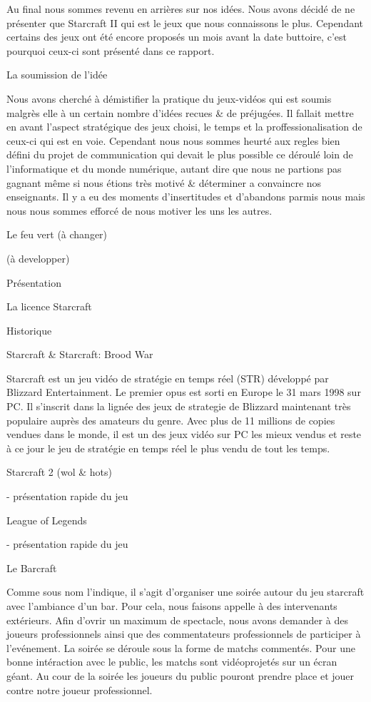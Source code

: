     Au final nous sommes revenu en arrières sur nos idées. Nous avons
    décidé de ne présenter que Starcraft II qui est le jeux que nous
    connaissons le plus. Cependant certains des jeux ont été encore
    proposés un mois avant la date buttoire, c'est pourquoi ceux-ci sont
    présenté dans ce rapport.

  La soumission de l'idée

    Nous avons cherché à démistifier la pratique du jeux-vidéos qui est
    soumis malgrès elle à un certain nombre d'idées recues & de
    préjugées. Il fallait mettre en avant l'aspect stratégique des jeux
    choisi, le temps et la proffessionalisation de ceux-ci qui est en
    voie. Cependant nous nous sommes heurté aux regles bien défini du
    projet de communication qui devait le plus possible ce déroulé loin
    de l'informatique et du monde numérique, autant dire que nous ne
    partions pas gagnant même si nous étions très motivé & déterminer a
    convaincre nos enseignants. Il y a eu des moments d'insertitudes et
    d'abandons parmis nous mais nous nous sommes efforcé de nous motiver
    les uns les autres.

  Le feu vert (à changer)

      (à developper)

Présentation

    La licence Starcraft

      Historique

        Starcraft & Starcraft: Brood War

          Starcraft est un jeu vidéo de stratégie en temps réel (STR) développé
          par Blizzard Entertainment. Le premier opus est sorti en Europe le 31
          mars 1998 sur PC. Il s'inscrit dans la lignée des jeux de strategie de
          Blizzard maintenant très populaire auprès des amateurs du genre. Avec
          plus de 11 millions de copies vendues dans le monde, il est un des
          jeux vidéo sur PC les mieux vendus et reste à ce jour le jeu de
          stratégie en temps réel le plus vendu de tout les temps.

        Starcraft 2 (wol & hots)

          - présentation rapide du jeu

        League of Legends

          - présentation rapide du jeu

	Le Barcraft

     Comme sous nom l'indique, il s'agit d'organiser une soirée autour
     du jeu starcraft avec l'ambiance d'un bar.	Pour cela, nous faisons
     appelle à des intervenants extérieurs. Afin d'ovrir un maximum de
     spectacle, nous avons demander à des joueurs professionnels ainsi
     que des commentateurs professionnels de participer à l'evénement.
     La soirée se déroule sous la forme de matchs commentés. Pour une
     bonne intéraction avec le public, les matchs sont vidéoprojetés sur
     un écran géant. Au cour de la soirée les joueurs du public pouront
     prendre place et jouer contre notre joueur professionnel.

